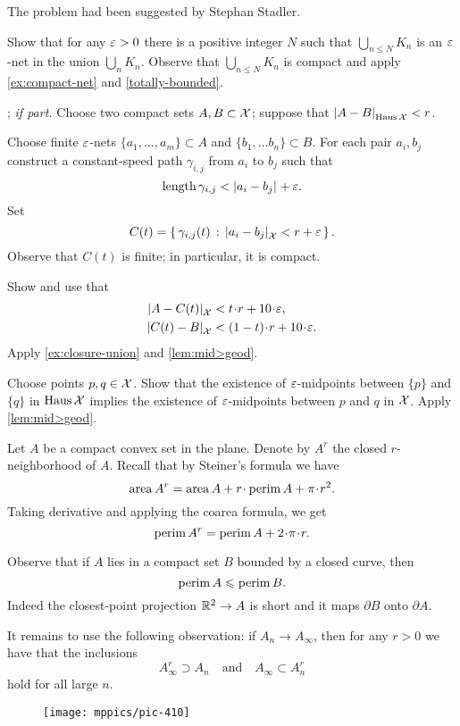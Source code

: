  The problem had been suggested by Stephan Stadler.

Show that for any $\varepsilon>0$ there is a positive integer $N$ such that $\bigcup_{n\le N} K_n$ is an $\varepsilon$-net in the union $\bigcup_{n} K_n$.
Observe that $\bigcup_{n\le N} K_n$
is compact and apply \ref{ex:compact-net} and \ref{totally-bounded}.

\parbf{\ref{ex:Haus-length}}; \textit{if part.}
Choose two compact sets $A,B\subset \mathcal{X}$;
suppose that $\dist{A}{B}{\Haus\spc{X}}<r$.

Choose finite $\varepsilon$-nets $\{a_1,\dots,a_m\}\subset A$ and $\{b_1,\dots b_n\}\subset B$.
For each pair $a_i,b_j$ construct a constant-speed path $\gamma_{i,j}$ from $a_i$ to $b_j$ such that 
\[\length \gamma_{i,j}<\dist{a_i}{b_j}{}+\eps.\]
Set 
\[C(t)=\set{\gamma_{i,j}(t)}{\dist{a_i}{b_j}{\spc{X}}<r+\eps}.\]
Observe that $C(t)$ is finite; in particular, it is compact.

Show and use that 
\begin{align*}
\dist{A}{C(t)}{\spc{X}}&<t\cdot r+10\cdot\eps,
\\
\dist{C(t)}{B}{\spc{X}}&<(1-t)\cdot r+10\cdot\eps.
\end{align*}
Apply \ref{ex:closure-union} and \ref{lem:mid>geod}.

Choose points $p,q\in\mathcal{X}$. 
Show that the existence of $\varepsilon$-midpoints between $\{p\}$ and $\{q\}$ in $\operatorname{\rm Haus}\nolimits\mathcal{X}$ implies the existence of $\varepsilon$-midpoints between $p$ and $q$ in $\mathcal{X}$.
Apply \ref{lem:mid>geod}.


Let $A$ be a compact convex set in the plane.
Denote by $A^r$ the closed $r$-neighborhood of $A$.
Recall that by Steiner's formula we have
\[\area A^r=\area A+r\cdot\perim A+\pi\cdot r^2.\]
Taking derivative and applying the coarea formula, we get 
\[\perim A^r=\perim A+2\cdot\pi\cdot r.\]

Observe that if $A$ lies in a compact set $B$ bounded by a closed curve, then 
\[\operatorname{\rm perim}\nolimits A\leqslant \operatorname{\rm perim}\nolimits B.\]
Indeed the closest-point projection $\mathbb{R}^2\to A$ is short and it maps $\partial B$ onto $\partial A$.

It remains to use the following observation: if $A_n\to A_\infty$, then for any $r>0$ we have that the inclusions
\[A_\infty^r\supset A_n
\quad\text{and}\quad
A_\infty\subset A_n^r\]
hold for all large $n$.

\begin{wrapfigure}{r}{27 mm}
\vskip-0mm
\centering
\texttt{[image: mppics/pic-410]}
\end{wrapfigure}

